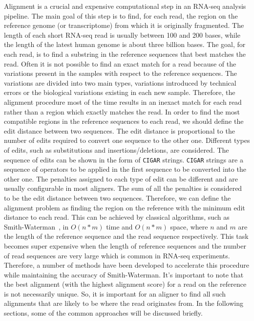 Alignment is a crucial and expensive computational step in an RNA-seq analysis 
pipeline. The main goal of this step is to find, for each read, the region on 
the reference genome (or transcriptome) from which it is originally fragmented. 
The length of each short RNA-seq read is usually between 100 and 200 bases, 
while the length of the latest human genome is about three billion bases. The goal, 
for each read, is  to find a substring in the reference sequences that best 
matches the read. Often it is not possible to find an exact match for a read 
because of the variations present in the samples with respect to the reference 
sequences. The variations are divided into two main types, variations introduced 
by technical errors or the biological variations existing in each new sample. 
Therefore, the alignment procedure most of the time results in an inexact 
match for each read rather than a region which exactly matches the read. 
In order to find the most compatible regions in the reference sequences to 
each read, we should define the edit distance between two sequences.
The edit distance is proportional to the number of edits required to convert one sequence to the 
other one. Different types of edits, such as substitutions and insertions/deletions,  
are considered.%
The sequence of edits can be shown in the form of \texttt{CIGAR} strings.
\texttt{CIGAR} strings are a sequence of operators to be applied in the first sequence
to be converted into the other one. 
The penalties assigned to each type of edit can be 
different and are usually configurable in most aligners. The sum of 
all the penalties is considered to be the edit distance between two sequences.
Therefore, we can define the alignment problem as finding the region on the 
reference with the minimum edit distance to each read. 
This can be achieved 
by classical algorithms, such as Smith-Waterman~\citep{smith1981identification}, 
in $O(n*m)$ time and $O(n*m)$ space, where $n$ and $m$ are the length of the 
reference sequence and the read sequence respectively. This task becomes 
super expensive when the length of reference sequences and the number of read 
sequences are very large which is common in RNA-seq experiments. 
Therefore, a number of methods have been developed to accelerate this procedure 
while maintaining the accuracy of Smith-Waterman. 
It's important to note that the best alignment (with the highest alignment score)
for a read on the reference is not necessarily unique. So, it is important for an aligner to 
find all such alignments that are likely to be where the read originates from.
In the following sections, some of the common approaches will be discussed briefly.

